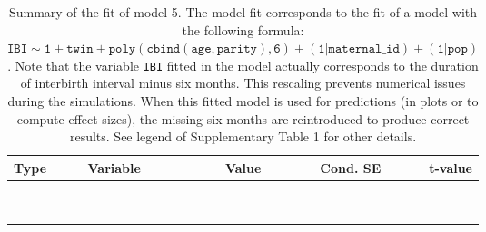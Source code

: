 \begin{table}[H]

\caption{\label{tab:tab5}Summary of the fit of model 5. The model fit corresponds to the fit of a model with the following formula: {\small$\mathtt{IBI \sim 1 + twin + poly(cbind(age, parity), 6) + (1 | maternal\_id) + (1 | pop)}$}. Note that the variable \texttt{IBI} fitted in the model actually corresponds to the duration of interbirth interval minus six months. This rescaling prevents numerical issues during the simulations. When this fitted model is used for predictions (in plots or to compute effect sizes), the missing six months are reintroduced to produce correct results. See legend of Supplementary Table 1 for other details.}
\centering
\fontsize{8}{10}\selectfont
\begin{tabular}[t]{>{\raggedright\arraybackslash}p{3cm}>{\raggedright\arraybackslash}p{5cm}rrr}
\toprule
Type & Variable & Value & Cond. SE & t-value\\
\midrule
\cellcolor{gray!6}{fixed effects} & \cellcolor{gray!6}{$\beta_1$} & \cellcolor{gray!6}{3.44} & \cellcolor{gray!6}{0.0579} & \cellcolor{gray!6}{59.5}\\
\cellcolor{gray!6}{} & \cellcolor{gray!6}{$\beta_{\mathtt{twin}}$} & \cellcolor{gray!6}{-0.0328} & \cellcolor{gray!6}{0.015} & \cellcolor{gray!6}{-2.18}\\
\cellcolor{gray!6}{} & \cellcolor{gray!6}{$\beta_{\mathtt{age}}$} & \cellcolor{gray!6}{-63.6} & \cellcolor{gray!6}{21.9} & \cellcolor{gray!6}{-2.9}\\
\cellcolor{gray!6}{} & \cellcolor{gray!6}{$\beta_{\mathtt{age}^2}$} & \cellcolor{gray!6}{39.7} & \cellcolor{gray!6}{19.6} & \cellcolor{gray!6}{2.02}\\
\cellcolor{gray!6}{} & \cellcolor{gray!6}{$\beta_{\mathtt{age}^3}$} & \cellcolor{gray!6}{-31.3} & \cellcolor{gray!6}{13} & \cellcolor{gray!6}{-2.41}\\
\cellcolor{gray!6}{} & \cellcolor{gray!6}{$\beta_{\mathtt{age}^4}$} & \cellcolor{gray!6}{15} & \cellcolor{gray!6}{6.31} & \cellcolor{gray!6}{2.38}\\
\cellcolor{gray!6}{} & \cellcolor{gray!6}{$\beta_{\mathtt{age}^5}$} & \cellcolor{gray!6}{-5} & \cellcolor{gray!6}{2.42} & \cellcolor{gray!6}{-2.07}\\
\cellcolor{gray!6}{} & \cellcolor{gray!6}{$\beta_{\mathtt{age}^6}$} & \cellcolor{gray!6}{4.01} & \cellcolor{gray!6}{1.01} & \cellcolor{gray!6}{3.95}\\
\cellcolor{gray!6}{} & \cellcolor{gray!6}{$\beta_{\mathtt{parity}}$} & \cellcolor{gray!6}{121} & \cellcolor{gray!6}{40.7} & \cellcolor{gray!6}{2.96}\\

\end{tabular}
\end{table}
